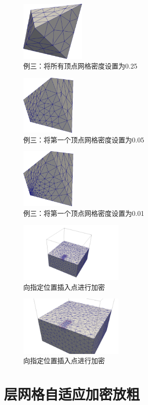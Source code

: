 \begin{figure}[!htbp]
  \centering
  \includegraphics[height=3cm]{fig/2/13.png}
  \caption{例三：将所有顶点网格密度设置为0.25}
  \label{fig:2-1}
\end{figure}

\begin{figure}[!htbp]
  \centering
  \includegraphics[height=3cm]{fig/2/14.png}
  \caption{例三：将第一个顶点网格密度设置为0.05}
  \label{fig:2-1}
\end{figure}

\begin{figure}[!htbp]
  \centering
  \includegraphics[height=3cm]{fig/2/15.png}
  \caption{例三：将第一个顶点网格密度设置为0.01}
  \label{fig:2-1}
\end{figure}

\begin{figure}[!htbp]
  \centering
  \includegraphics[height=3cm]{fig/2/16.png}
  \caption{向指定位置插入点进行加密}
  \label{fig:2-1}
\end{figure}

\begin{figure}[!htbp]
  \centering
  \includegraphics[height=3cm]{fig/2/17.png}
  \caption{向指定位置插入点进行加密}
  \label{fig:2-1}
\end{figure}

\section{层网格自适应加密放粗}
